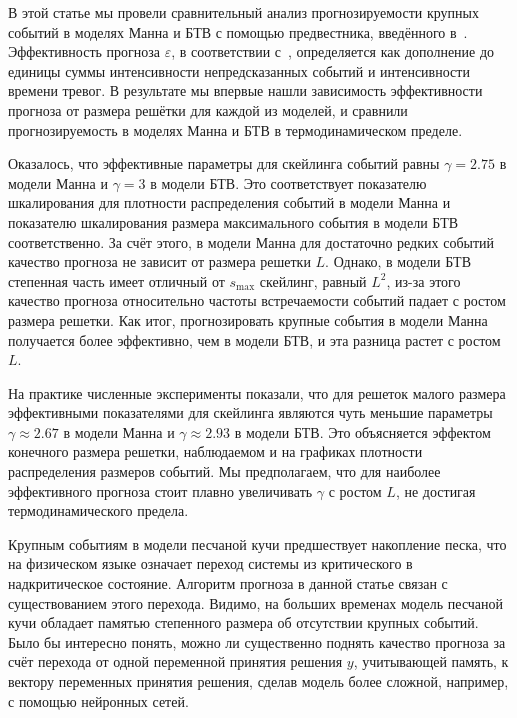 В этой статье мы провели сравнительный анализ прогнозируемости крупных событий в моделях Манна и БТВ с помощью предвестника, введённого в~\cite{Hallerberg2009}. Эффективность прогноза $\varepsilon$, в соответствии с~\cite{Molchan1997}, определяется как дополнение до единицы суммы интенсивности непредсказанных событий и интенсивности времени тревог. В результате мы впервые нашли зависимость эффективности прогноза от размера решётки для каждой из моделей, и сравнили прогнозируемость в моделях Манна и БТВ в термодинамическом пределе.



Оказалось, что эффективные параметры для скейлинга событий равны $\gamma=2.75$ в модели Манна и $\gamma=3$ в модели БТВ. Это соответствует показателю шкалирования для плотности распределения событий в модели Манна и показателю шкалирования размера максимального события в модели БТВ соответственно. За счёт этого, в модели Манна для достаточно редких событий качество прогноза не зависит от размера решетки $L$. Однако, в модели БТВ степенная часть имеет отличный от $s_{\max}$ скейлинг, равный $L^2$, из-за этого качество прогноза относительно частоты встречаемости событий падает с ростом размера решетки. Как итог, прогнозировать крупные события в модели Манна получается более эффективно, чем в модели БТВ, и эта разница растет с ростом $L$.

На практике численные эксперименты показали, что для решеток малого размера эффективными показателями для скейлинга являются чуть меньшие параметры $\gamma \approx 2.67$ в модели Манна и $\gamma \approx 2.93$ в модели БТВ. Это объясняется эффектом конечного размера решетки, наблюдаемом и на графиках плотности распределения размеров событий. Мы предполагаем, что для наиболее эффективного прогноза стоит плавно увеличивать $\gamma$ с ростом $L$, не достигая термодинамического предела.

Крупным событиям в модели песчаной кучи предшествует накопление песка, что на физическом языке означает переход системы из критического в надкритическое состояние. Алгоритм прогноза в данной статье связан с существованием этого перехода. Видимо, на больших временах модель песчаной кучи обладает памятью степенного размера об отсутствии крупных событий. Было бы интересно понять, можно ли существенно поднять качество прогноза за счёт перехода от одной переменной принятия решения $y$, учитывающей память, к вектору переменных принятия решения, сделав модель более сложной, например, с помощью нейронных сетей.

